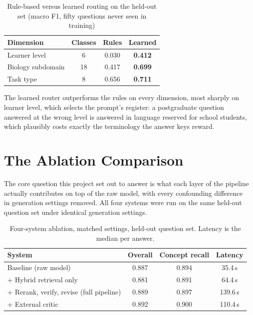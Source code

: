 \begin{table}[h]
\centering
\caption[Rule-based versus learned routing]{Rule-based versus learned
routing on the held-out set (macro F1, fifty questions never seen in
training)}
\label{tab:4.5b}
\begin{tabular}{lccc}
\hline
\textbf{Dimension} & \textbf{Classes} & \textbf{Rules} & \textbf{Learned} \\
\hline
Learner level & 6 & 0.030 & \textbf{0.412} \\
Biology subdomain & 18 & 0.417 & \textbf{0.699} \\
Task type & 8 & 0.656 & \textbf{0.711} \\
\hline
\end{tabular}
\end{table}

The learned router outperforms the rules on every dimension, most sharply
on learner level, which selects the prompt's register: a postgraduate
question answered at the wrong level is answered in language reserved for
school students, which plausibly costs exactly the terminology the answer
keys reward.

\section{The Ablation Comparison}\label{4.11}

The core question this project set out to answer is what each layer of
the pipeline actually contributes on top of the raw model, with every
confounding difference in generation settings removed. All four systems
were run on the same held-out question set under identical generation
settings.

\begin{table}[h]
\centering
\caption[Four-system ablation, matched settings]{Four-system ablation,
matched settings, held-out question set. Latency is the median per answer.}
\label{tab:4.6}
\small
\begin{tabular}{@{}lccc@{}}
\toprule
\textbf{System} & \textbf{Overall} & \textbf{Concept recall} & \textbf{Latency} \\
\midrule
Baseline (raw model) & 0.887 & 0.894 & 35.4\,s \\
+ Hybrid retrieval only & 0.881 & 0.891 & 64.4\,s \\
+ Rerank, verify, revise (full pipeline) & 0.889 & 0.897 & 139.6\,s \\
+ External critic & 0.892 & 0.900 & 110.4\,s \\
\bottomrule
\end{tabular}
\end{table}

